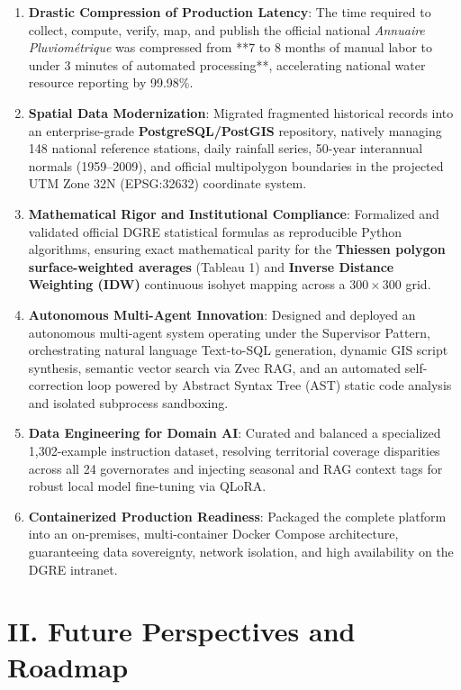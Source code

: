 \documentclass[12pt,a4paper]{report}
\begin{document}
\begin{enumerate}
  \item \textbf{Drastic Compression of Production Latency}: The time required to collect, compute, verify, map, and publish the official national \textit{Annuaire Pluviométrique} was compressed from **7 to 8 months of manual labor to under 3 minutes of automated processing**, accelerating national water resource reporting by 99.98\%.
  \item \textbf{Spatial Data Modernization}: Migrated fragmented historical records into an enterprise-grade \textbf{PostgreSQL/PostGIS} repository, natively managing 148 national reference stations, daily rainfall series, 50-year interannual normals (1959--2009), and official multipolygon boundaries in the projected UTM Zone 32N (EPSG:32632) coordinate system.
  \item \textbf{Mathematical Rigor and Institutional Compliance}: Formalized and validated official DGRE statistical formulas as reproducible Python algorithms, ensuring exact mathematical parity for the \textbf{Thiessen polygon surface-weighted averages} (Tableau 1) and \textbf{Inverse Distance Weighting (IDW)} continuous isohyet mapping across a $300 \times 300$ grid.
  \item \textbf{Autonomous Multi-Agent Innovation}: Designed and deployed an autonomous multi-agent system operating under the Supervisor Pattern, orchestrating natural language Text-to-SQL generation, dynamic GIS script synthesis, semantic vector search via Zvec RAG, and an automated self-correction loop powered by Abstract Syntax Tree (AST) static code analysis and isolated subprocess sandboxing.
  \item \textbf{Data Engineering for Domain AI}: Curated and balanced a specialized 1,302-example instruction dataset, resolving territorial coverage disparities across all 24 governorates and injecting seasonal and RAG context tags for robust local model fine-tuning via QLoRA.
  \item \textbf{Containerized Production Readiness}: Packaged the complete platform into an on-premises, multi-container Docker Compose architecture, guaranteeing data sovereignty, network isolation, and high availability on the DGRE intranet.
\end{enumerate}

\section*{II. Future Perspectives and Roadmap}
\end{document}
